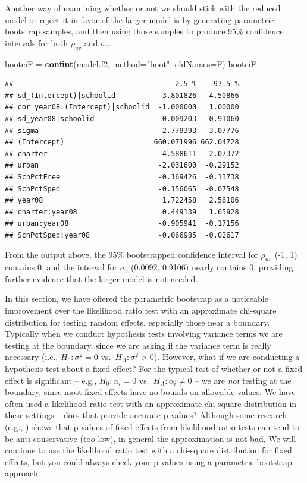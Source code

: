 \documentclass[
]{krantz}
\newenvironment{Shaded}{\begin{snugshade}}{\end{snugshade}}
\newcommand{\DataTypeTok}[1]{\textcolor[rgb]{0.27,0.27,0.27}{#1}}
\newcommand{\KeywordTok}[1]{\textcolor[rgb]{0.27,0.27,0.27}{\textbf{#1}}}
\newcommand{\NormalTok}[1]{#1}
\newcommand{\StringTok}[1]{\textcolor[rgb]{0.5,0.5,0.5}{#1}}
\begin{document}
Another way of examining whether or not we should stick with the reduced model or reject it in favor of the larger model is by generating parametric bootstrap samples, and then using those samples to produce 95\% confidence intervals for both \(\rho_{uv}\) and \(\sigma_{v}\).

\begin{Shaded}
\begin{Highlighting}[]
\NormalTok{bootciF =}\StringTok{ }\KeywordTok{confint}\NormalTok{(model.f2, }\DataTypeTok{method=}\StringTok{"boot"}\NormalTok{, }\DataTypeTok{oldNames=}\NormalTok{F)}
\NormalTok{bootciF}
\end{Highlighting}
\end{Shaded}

\begin{verbatim}
##                                      2.5 %    97.5 %
## sd_(Intercept)|schoolid           3.801826   4.50866
## cor_year08.(Intercept)|schoolid  -1.000000   1.00000
## sd_year08|schoolid                0.009203   0.91060
## sigma                             2.779393   3.07776
## (Intercept)                     660.071996 662.04728
## charter                          -4.588611  -2.07372
## urban                            -2.031600  -0.29152
## SchPctFree                       -0.169426  -0.13738
## SchPctSped                       -0.156065  -0.07548
## year08                            1.722458   2.56106
## charter:year08                    0.449139   1.65928
## urban:year08                     -0.905941  -0.17156
## SchPctSped:year08                -0.066985  -0.02617
\end{verbatim}

From the output above, the 95\% bootstrapped confidence interval for \(\rho_{uv}\) (-1, 1) contains 0, and the interval for \(\sigma_{v}\) (0.0092, 0.9106) nearly contains 0, providing further evidence that the larger model is not needed.

In this section, we have offered the parametric bootstrap as a noticeable improvement over the likelihood ratio test with an approximate chi-square distribution for testing random effects, especially those near a boundary. Typically when we conduct hypothesis tests involving variance terms we are testing at the boundary, since we are asking if the variance term is really necessary (i.e., \(H_0: \sigma^2=0\) vs.~\(H_A: \sigma^2 > 0\)). However, what if we are conducting a hypothesis test about a fixed effect? For the typical test of whether or not a fixed effect is significant -- e.g., \(H_0: \alpha_i=0\) vs.~\(H_A: \alpha_i \neq 0\) -- we are \emph{not} testing at the boundary, since most fixed effects have no bounds on allowable values. We have often used a likelihood ratio test with an approximate chi-square distribution in these settings -- does that provide accurate p-values? Although some research (e.g., \citet{Faraway2005}) shows that p-values of fixed effects from likelihood ratio tests can tend to be anti-conservative (too low), in general the approximation is not bad. We will continue to use the likelihood ratio test with a chi-square distribution for fixed effects, but you could always check your p-values using a parametric bootstrap approach.
\end{document}
